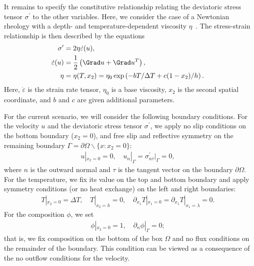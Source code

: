 It remains to specify the constitutive relationship relating the
deviatoric stress tensor $\sigma^{\prime}$ to the other
variables. Here, we consider the case of a Newtonian rheology with a
depth- and temperature-dependent viscosity
$\eta$~\citep{BlankenbachBusse1989}. The stress-strain relationship is
then described by the equations
\begin{align}
  \sigma^{\prime} &= 2 \eta \dot{\varepsilon} (u), \\
  \dot{\varepsilon}(u) &= \frac{1}{2} \left (\Grad u + \Grad u^T \right),  \\
  \eta &= \eta(T, x_2)
  = \eta_0 \exp \left( -b T/\Delta T + c (1 - x_2)/ h \right) .
\end{align}
Here, $\dot {\varepsilon}$ is the strain rate tensor, $\eta_0$ is a
base viscosity, $x_2$ is the second spatial coordinate, and $b$ and
$c$ are given additional parameters.

For the current scenario, we will consider the following boundary
conditions. For the velocity $u$ and the deviatoric stress tensor
$\sigma^{\prime}$, we apply no slip conditions on the bottom boundary
($x_2 = 0$), and free slip and reflective symmetry on the remaining
boundary $\Gamma = \partial \Omega \backslash \{x: x_2 = 0 \}$:
\begin{align}
  \label{vynnytska:eq:bcs}
  u |_{x_2 = 0} = 0, \quad
  u_n|_{\Gamma}  =  \sigma^{\prime}_{n \tau} |_{\Gamma} = 0,
\end{align}
where $n$ is the outward normal and $\tau$ is the tangent vector on
the boundary $\partial \Omega$. For the temperature, we fix its value
on the top and bottom boundary and apply symmetry conditions (or no
heat exchange) on the left and right boundaries:
\begin{align}
  T |_{x_2 = 0} = \Delta T, \quad T |_{x_2 = h}  = 0, \quad
  \partial_{x_1} T |_{x_1 = 0}  = \partial_{x_1} T |_{x_1 = \lambda} = 0.
\end{align}
For the composition $\phi$, we set
\begin{align}
  \phi |_{x_2 = 0} = 1, \quad \partial_{n} \phi|_{\Gamma} = 0;
\end{align}
that is, we fix composition on the bottom of the box $\Omega$ and no flux
conditions on the remainder of the boundary. This condition can be
viewed as a consequence of the no outflow conditions for the velocity.

